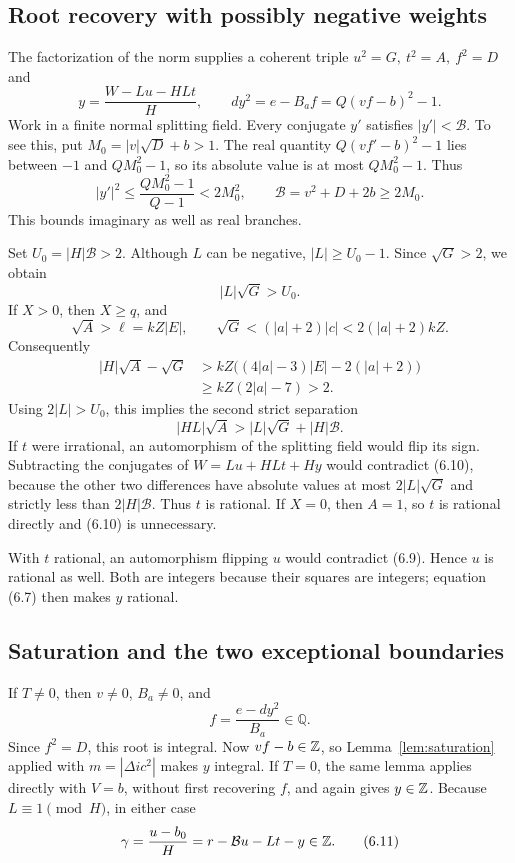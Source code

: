 \subsection{Root recovery with possibly negative weights}

The factorization of the norm supplies a coherent triple
\(u^2=G,\ t^2=A,\ f^2=D\) and
\[
y=\frac{W-Lu-HLt}{H},\qquad
dy^2=e-B_af=Q(vf-b)^2-1.
\tag{6.7}
\]
Work in a finite normal splitting field. Every conjugate \(y'\)
satisfies \(|y'|<\mathcal B\).
To see this, put \(M_0=|v|\sqrt D+b>1\).
The real quantity \(Q(vf'-b)^2-1\) lies between \(-1\) and
\(QM_0^2-1\), so its absolute value is at most \(QM_0^2-1\).
Thus
\[
|y'|^2\le\frac{QM_0^2-1}{Q-1}<2M_0^2,\qquad
\mathcal B=v^2+D+2b\ge2M_0.
\tag{6.8}
\]
This bounds imaginary as well as real branches.

Set \(U_0=|H|\mathcal B>2\).
Although \(L\) can be negative, \(|L|\ge U_0-1\).
Since \(\sqrt G>2\), we obtain
\[
|L|\sqrt G>U_0.
\tag{6.9}
\]
If \(X>0\), then \(X\ge q\), and
\[
\sqrt A>\ell=kZ|E|,\qquad
\sqrt G<(|a|+2)|c|<2(|a|+2)kZ.
\]
Consequently
\[
\begin{split}
|H|\sqrt A-\sqrt G
&>kZ\bigl((4|a|-3)|E|-2(|a|+2)\bigr)\\
&\ge kZ(2|a|-7)>2.
\end{split}
\]
Using \(2|L|>U_0\), this implies the second strict separation
\[
|HL|\sqrt A>|L|\sqrt G+|H|\mathcal B.
\tag{6.10}
\]
If \(t\) were irrational, an automorphism of the splitting field
would flip its sign. Subtracting the conjugates of
\(W=Lu+HLt+Hy\) would contradict (6.10), because the other two
differences have absolute values at most \(2|L|\sqrt G\)
and strictly less than \(2|H|\mathcal B\).
Thus \(t\) is rational.
If \(X=0\), then \(A=1\), so \(t\) is rational directly
and (6.10) is unnecessary.

With \(t\) rational, an automorphism flipping \(u\) would contradict
(6.9). Hence \(u\) is rational as well. Both are integers because
their squares are integers; equation (6.7) then makes \(y\) rational.

\subsection{Saturation and the two exceptional boundaries}

If \(T\ne0\), then \(v\ne0\), \(B_a\ne0\), and
\[
f=\frac{e-dy^2}{B_a}\in\mathbb Q.
\]
Since \(f^2=D\), this root is integral. Now \(vf-b\in\mathbb Z\), so
Lemma~\ref{lem:saturation} applied with
\(m=|\Delta ic^2|\) makes \(y\) integral.
If \(T=0\), the same lemma applies directly with \(V=b\),
without first recovering \(f\), and again gives \(y\in\mathbb Z\).
Because \(L\equiv1\pmod H\), in either case
\[
\gamma=\frac{u-b_0}{H}
=r-\mathcal B u-Lt-y\in\mathbb Z.
\tag{6.11}
\]

